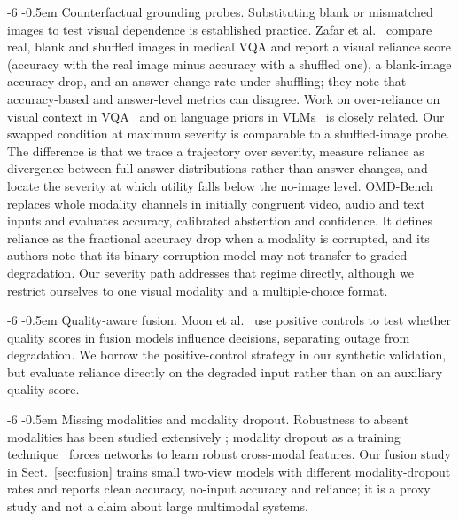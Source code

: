 \documentclass[graybox]{svmult}
\makeatletter
\renewcommand\paragraph{\@startsection{paragraph}{4}{\z@}%
  {-6\p@ \@plus -2\p@ \@minus -2\p@}%
  {-0.5em}%
  {\normalfont\normalsize\bfseries}}
\makeatother
\begin{document}
\paragraph{Counterfactual grounding probes.}
Substituting blank or mismatched images to test visual dependence is
established practice. Zafar et al.~\cite{zafar2026grounding} compare real,
blank and shuffled images in medical VQA and report a visual reliance
score (accuracy with the real image minus accuracy with a shuffled one),
a blank-image accuracy drop, and an answer-change rate under shuffling;
they note that accuracy-based and answer-level metrics can disagree. Work
on over-reliance on visual context in VQA~\cite{gupta2022swapmix}
and on language priors in VLMs~\cite{goyal2017making,agrawal2018dont} is
closely related. Our swapped
condition at maximum severity is comparable to a shuffled-image probe. The
difference is that we trace a trajectory over severity, measure reliance
as divergence between full answer distributions rather than answer
changes, and locate the severity at which utility falls below the
no-image level.
OMD-Bench~\cite{nazi2026omd} replaces whole modality channels in
initially congruent video, audio and text inputs and evaluates
accuracy, calibrated abstention and confidence. It defines reliance as the
fractional accuracy drop when a modality is corrupted, and its authors
note that its binary corruption model may not transfer to graded
degradation. Our severity path addresses that regime directly, although
we restrict ourselves to one visual modality and a multiple-choice
format.

\paragraph{Quality-aware fusion.}
Moon et al.~\cite{moon2026quality} use positive controls to test whether
quality scores in fusion models influence decisions, separating outage from
degradation. We borrow the positive-control strategy in our synthetic
validation, but evaluate reliance directly on the degraded input rather than on
an auxiliary quality score.

\paragraph{Missing modalities and modality dropout.}
Robustness to absent modalities has been studied extensively
\cite{ma2022missing}; modality dropout as a training
technique~\cite{neverova2016moddrop} forces networks to learn robust
cross-modal features.
Our fusion study in Sect.~\ref{sec:fusion} trains small two-view models
with different modality-dropout rates and reports clean accuracy,
no-input accuracy and reliance; it is a proxy study and not a claim about
large multimodal systems.
\end{document}
